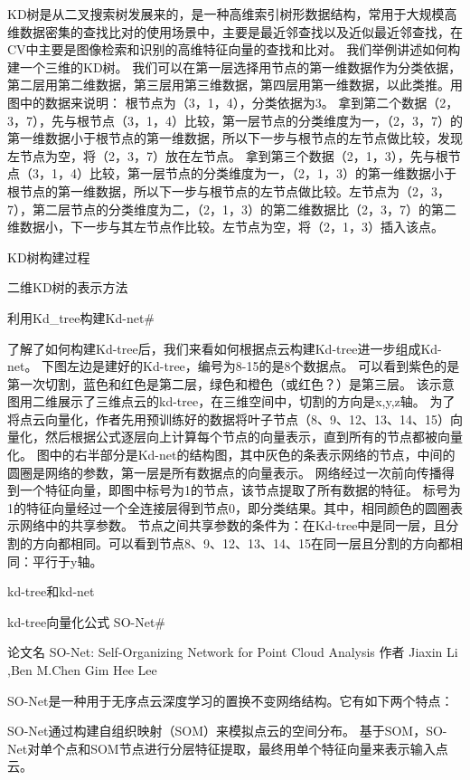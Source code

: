 \documentclass{amsart}
\begin{document}
KD树是从二叉搜索树发展来的，是一种高维索引树形数据结构，常用于大规模高维数据密集的查找比对的使用场景中，主要是最近邻查找以及近似最近邻查找，在CV中主要是图像检索和识别的高维特征向量的查找和比对。
我们举例讲述如何构建一个三维的KD树。
我们可以在第一层选择用节点的第一维数据作为分类依据，第二层用第二维数据，第三层用第三维数据，第四层用第一维数据，以此类推。用图中的数据来说明：
    根节点为（3，1，4），分类依据为3。
    拿到第二个数据（2，3，7），先与根节点（3，1，4）比较，第一层节点的分类维度为一，（2，3，7）的第一维数据小于根节点的第一维数据，所以下一步与根节点的左节点做比较，发现左节点为空，将（2，3，7）放在左节点。
    拿到第三个数据（2，1，3），先与根节点（3，1，4）比较，第一层节点的分类维度为一，（2，1，3）的第一维数据小于根节点的第一维数据，所以下一步与根节点的左节点做比较。左节点为（2，3，7），第二层节点的分类维度为二，（2，1，3）的第二维数据比（2，3，7）的第二维数据小，下一步与其左节点作比较。左节点为空，将（2，1，3）插入该点。

    KD树构建过程

    二维KD树的表示方法

利用Kd_tree构建Kd-net#

了解了如何构建Kd-tree后，我们来看如何根据点云构建Kd-tree进一步组成Kd-net。
下图左边是建好的Kd-tree，编号为8-15的是8个数据点。
可以看到紫色的是第一次切割，蓝色和红色是第二层，绿色和橙色（或红色？）是第三层。
该示意图用二维展示了三维点云的kd-tree，在三维空间中，切割的方向是x,y,z轴。
为了将点云向量化，作者先用预训练好的数据将叶子节点（8、9、12、13、14、15）向量化，然后根据公式逐层向上计算每个节点的向量表示，直到所有的节点都被向量化。
图中的右半部分是Kd-net的结构图，其中灰色的条表示网络的节点，中间的圆圈是网络的参数，第一层是所有数据点的向量表示。
网络经过一次前向传播得到一个特征向量，即图中标号为1的节点，该节点提取了所有数据的特征。
标号为1的特征向量经过一个全连接层得到节点0，即分类结果。其中，相同颜色的圆圈表示网络中的共享参数。
节点之间共享参数的条件为：在Kd-tree中是同一层，且分割的方向都相同。可以看到节点8、9、12、13、14、15在同一层且分割的方向都相同：平行于y轴。

kd-tree和kd-net

kd-tree向量化公式
SO-Net#

    论文名 SO-Net: Self-Organizing Network for Point Cloud Analysis
    作者 Jiaxin Li ,Ben M.Chen Gim Hee Lee

SO-Net是一种用于无序点云深度学习的置换不变网络结构。它有如下两个特点：

    SO-Net通过构建自组织映射（SOM）来模拟点云的空间分布。
    基于SOM，SO-Net对单个点和SOM节点进行分层特征提取，最终用单个特征向量来表示输入点云。
\end{document}
